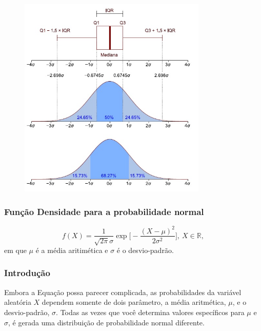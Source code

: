 \documentclass[14pt,aspectratio=1610]{beamer}
\begin{document}
\begin{frame}{}
\frametitle{}
\begin{figure}[H]
    \centering
    \includegraphics[height=0.6\textwidth, width=0.8\textwidth]{Aula11DistribuicoesContinuas/figs/Amplitude_interquartil.jpg}
  \end{figure}
\end{frame}

\begin{frame}{}
\frametitle{Função Densidade para a probabilidade normal}
\begin{block}{}
\justifying
\begin{equation}
f(X)=\dfrac{1}{\sqrt{2\pi}\sigma}\exp{\Biggl[-\dfrac{(X-\mu)^{2}}{2\sigma^{2}}\Biggl]},\ X\in  \mathds{R},
\end{equation}
em que $\mu$ é a média aritimética e $\sigma$ é o desvio-padrão.
\end{block}
\end{frame}

\begin{frame}{}
\frametitle{Introdução}
\begin{block}{}
\justifying
Embora a Equação possa parecer complicada, as probabilidades da variável aleatória $X$ dependem somente de dois parâmetro, a média aritmética, $\mu$, e o desvio-padrão, $\sigma$. Todas as vezes que você determina valores específicos para $\mu$ e $\sigma$, é gerada uma distribuição de probabilidade normal diferente.
\end{block}
\end{frame}
\end{document}
